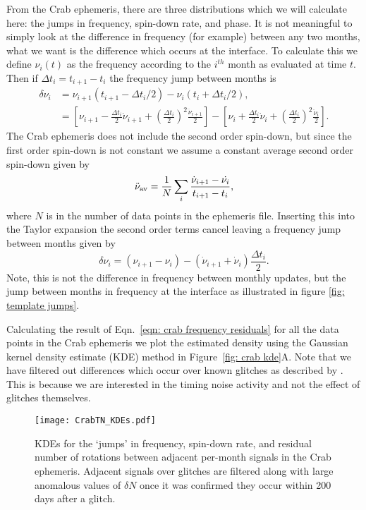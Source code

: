 \documentclass[../full_thesis/full_thesis.tex]{subfiles}
\begin{document}
{From the Crab ephemeris, there are three distributions which we will calculate
here: the jumps in frequency, spin-down rate, and phase. It is not meaningful
to simply look at the difference in frequency (for example) between any two
months, what we want is the difference which occurs at the interface. To
calculate this we define $\nu_{i}(t)$ as the frequency according to the
$i^{th}$ month as evaluated at time $t$. Then if $\Delta t_{i} = t_{i+1} -
t_{i}$ the frequency jump between months is
\begin{align}
\delta\nu_{i} &= \nu_{i+1}\left(t_{i+1}-\Delta t_{i}/2\right) -  \nu_{i}\left(t_{i}+\Delta t_{i}/2\right), \\
    &= \left[\nu_{i+1}- \frac{\Delta t_{i}}{2}\dot{\nu}_{i+1} + \left(\frac{\Delta t_{i}}{2}\right)^{2}\frac{\ddot{\nu}_{i+1}}{2}\right]
     - \left[\nu_{i} + \frac{\Delta t_{i}}{2}\dot{\nu}_{i}+ \left(\frac{\Delta t_{i}}{2}\right)^{2}\frac{\ddot{\nu}_{i}}{2}\right] .
\end{align}
The Crab ephemeris does not include the second order spin-down, but since the
first order spin-down is not constant we assume a constant average second order
spin-down given by
\begin{equation}
   \ddot{\nu}_{\textrm{av}} = \frac{1}{N}\sum_{i} \frac{\dot{\nu}_{i+1} - \dot{\nu_{i}}}{t_{i+1} - t_{i}},
   \label{eqn: average second order spin-down}
\end{equation}
where $N$ is in the number of data points in the ephemeris file. Inserting this
into the Taylor expansion the second order terms cancel leaving a frequency
jump between months given by
\begin{equation}
\delta\nu_{i} = \left(\nu_{i+1}- \nu_{i}\right) -  \left(\dot{\nu}_{i+1}
               + \dot{\nu}_{i}\right)\frac{\Delta t_{i}}{2}.
\label{eqn: crab frequency residuals}
\end{equation}
Note, this is not the difference in frequency between monthly
updates, but the jump between months in frequency at the interface as illustrated in figure
\ref{fig: template jumps}.

Calculating the result of Eqn.~\eqref{eqn: crab frequency residuals} for all
the data points in the Crab ephemeris we plot the estimated density using the
Gaussian kernel density estimate (KDE) method \citep{Scipy} in Figure~\ref{fig:
crab kde}A. Note that we have filtered out differences which occur over known
glitches as described by \citet{Espinoza2011}. This is because we are
interested in the timing noise activity and not the effect of glitches
themselves.
\begin{figure}[ht]
\centering
\texttt{[image: CrabTN\_KDEs.pdf]}
\caption{KDEs for the `jumps' in frequency, spin-down rate, and residual number
of rotations between adjacent per-month signals in the Crab ephemeris.
Adjacent signals over glitches are filtered along with large anomalous values
of $\delta N$ once it was confirmed they occur within 200 days after a glitch.}
\label{fig: crab kde}
\end{figure}

}
\end{document}
